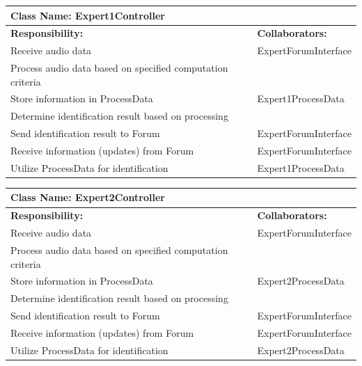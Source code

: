\documentclass[]{article}
\begin{document}
	\begin{table}[ht]
		\centering
		\begin{tabular}{|p{5cm}|p{5cm}|}
		\hline 
		 \multicolumn{2}{|l|}{\textbf{Class Name: Expert1Controller}} \\
		\hline
		\textbf{Responsibility:} & \textbf{Collaborators:} \\
		\hline
		Receive audio data & ExpertForumInterface \\
		\hline
		Process audio data based on specified computation criteria &  \\
		\hline
		Store information in ProcessData & Expert1ProcessData \\
		\hline
		Determine identification result based on processing &  \\
		\hline
		Send identification result to Forum & ExpertForumInterface \\
		\hline
		Receive information (updates) from Forum & ExpertForumInterface \\
		\hline
		Utilize ProcessData for identification & Expert1ProcessData \\
		\hline
		\end{tabular}
	\end{table}
	
\newpage
	\begin{table}[ht]
		\centering
		\begin{tabular}{|p{5cm}|p{5cm}|}
		\hline 
		 \multicolumn{2}{|l|}{\textbf{Class Name: Expert2Controller}} \\
		\hline
		\textbf{Responsibility:} & \textbf{Collaborators:} \\
		\hline
		Receive audio data & ExpertForumInterface \\
		\hline
		Process audio data based on specified computation criteria &  \\
		\hline
		Store information in ProcessData & Expert2ProcessData \\
		\hline
		Determine identification result based on processing &  \\
		\hline
		Send identification result to Forum & ExpertForumInterface \\
		\hline
		Receive information (updates) from Forum & ExpertForumInterface \\
		\hline
		Utilize ProcessData for identification & Expert2ProcessData \\
		\hline
		\end{tabular}
	\end{table}
\end{document}
